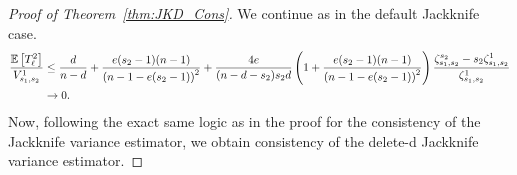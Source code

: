 \begin{proof}[Proof of Theorem~\ref{thm:JKD_Cons}]
	We continue as in the default Jackknife case.
	\begin{equation}
		\begin{aligned}
			\frac{\mathbb{E}\left[T_{\ell}^2\right]}{V_{s_1, s_2}^{1}}
			 & \leq \frac{d}{n - d} + \frac{e (s_2 - 1)(n - 1)}{\left(n - 1 - e (s_2 - 1)\right)^2}
			+ \frac{4e}{(n - d - s_2)s_2 d}\left(1 + \frac{e (s_2 - 1)(n - 1)}{\left(n - 1 - e (s_2 - 1)\right)^2}\right) \frac{\zeta_{s_1, s_2}^{s_2} - s_2 \zeta_{s_1, s_2}^{1}}{\zeta_{s_1, s_2}^{1}} \\
			 & \rightarrow 0.
		\end{aligned}
	\end{equation}
	Now, following the exact same logic as in the proof for the consistency of the Jackknife variance estimator, we obtain consistency of the delete-d Jackknife variance estimator.
\end{proof}
